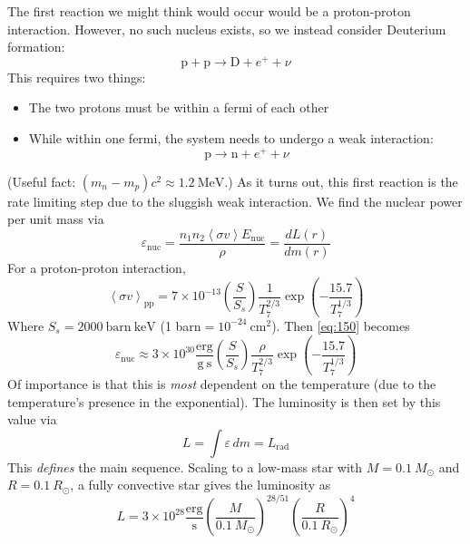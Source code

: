 \documentclass[10pt]{article}
\numberwithin{equation}{section}
\newcommand{\n}{\noindent}
\newcommand{\avg}[1]{\left\langle#1\right\rangle}
\begin{document}
  \n The first reaction we might think would occur would be a
  proton-proton interaction. However, no such nucleus exists, so we
  instead consider Deuterium formation:
  \begin{equation}
    \label{eq:148}
    \mathrm{p+p\to D}+e^++\nu
  \end{equation}
  This requires two things:
  \begin{itemize}
  \item The two protons must be within a fermi of each
    other
  \item While within one fermi, the system needs to undergo a weak
    interaction:
    \begin{equation}
      \label{eq:149}
      \mathrm{p\to n+}e^++\nu
    \end{equation}
  \end{itemize}
  (Useful fact: $(m_n-m_p)c^2\approx 1.2\ \mathrm{MeV}$.) As it turns
  out, this first reaction is the rate limiting step due to the
  sluggish weak interaction. We find the nuclear power per unit mass
  via
  \begin{equation}
    \label{eq:150}
    \varepsilon_{\mathrm{nuc}}=\frac{n_1n_2\avg{\sigma v}E_{\mathrm{nuc}}}
{\rho}=\frac{dL(r)}{dm(r)}
  \end{equation}
  For a proton-proton interaction,
  \begin{equation}
    \label{eq:151}
    \avg{\sigma v}_{\mathrm{pp}}=7\times 10^{-13}\left(\frac{S}{S_s}\right)
\frac{1}{T_7^{2/3}}\exp\left(-\frac{15.7}{T_7^{1/3}}\right)
  \end{equation}
  Where $S_s=2000\ \mathrm{barn\ keV}$ (1 barn$=10^{-24}\
  \mathrm{cm^2}$). Then \eqref{eq:150} becomes
  \begin{equation}
    \label{eq:152}
    \varepsilon_{\mathrm{nuc}}\approx 3\times
    10^{30}\frac{\mathrm{erg}}{\mathrm{g\ s}}\left(\frac{S}{S_s}\right)
\frac{\rho}{T_7^{2/3}}\exp\left(-\frac{15.7}{T_7^{1/3}}\right)
  \end{equation}
  Of importance is that this is \emph{most} dependent on the
  temperature (due to the temperature's presence in the
  exponential). The luminosity is then set by this value via
  \begin{equation}
    \label{eq:153}
    L=\int \varepsilon\,dm=L_{\mathrm{rad}}
  \end{equation}
  This \emph{defines} the main sequence. Scaling to a low-mass star
  with $M=0.1\ M_\odot$ and $R=0.1\ R_\odot$, a fully convective star
  gives the luminosity as
  \begin{equation}
    \label{eq:154}
    L=3\times
    10^{28}\frac{\mathrm{erg}}{\mathrm{s}}\left(\frac{M}{0.1\
        M_\odot}\right)^{28/51}\left(\frac{R}{0.1\ R_\odot}\right)^4
  \end{equation}
\end{document}
